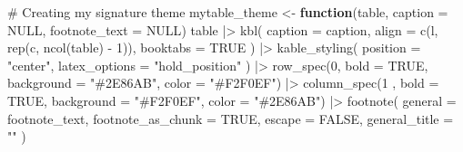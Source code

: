 \documentclass[
  letterpaper,
  DIV=11,
  numbers=noendperiod]{scrartcl}
\newenvironment{Shaded}{\begin{snugshade}}{\end{snugshade}}
\newcommand{\AttributeTok}[1]{\textcolor[rgb]{0.40,0.45,0.13}{#1}}
\newcommand{\CommentTok}[1]{\textcolor[rgb]{0.37,0.37,0.37}{#1}}
\newcommand{\ConstantTok}[1]{\textcolor[rgb]{0.56,0.35,0.01}{#1}}
\newcommand{\ControlFlowTok}[1]{\textcolor[rgb]{0.00,0.23,0.31}{\textbf{#1}}}
\newcommand{\DecValTok}[1]{\textcolor[rgb]{0.68,0.00,0.00}{#1}}
\newcommand{\FunctionTok}[1]{\textcolor[rgb]{0.28,0.35,0.67}{#1}}
\newcommand{\NormalTok}[1]{\textcolor[rgb]{0.00,0.23,0.31}{#1}}
\newcommand{\OtherTok}[1]{\textcolor[rgb]{0.00,0.23,0.31}{#1}}
\newcommand{\SpecialCharTok}[1]{\textcolor[rgb]{0.37,0.37,0.37}{#1}}
\newcommand{\StringTok}[1]{\textcolor[rgb]{0.13,0.47,0.30}{#1}}
\begin{document}
\begin{Shaded}
\begin{Highlighting}[]
\CommentTok{\# Creating my signature theme}
\NormalTok{mytable\_theme }\OtherTok{\textless{}{-}} \ControlFlowTok{function}\NormalTok{(table, }
                           \AttributeTok{caption =} \ConstantTok{NULL}\NormalTok{,}
                           \AttributeTok{footnote\_text =} \ConstantTok{NULL}\NormalTok{)}
\NormalTok{  table }\SpecialCharTok{|\textgreater{}}
    \FunctionTok{kbl}\NormalTok{(}
      \AttributeTok{caption =}\NormalTok{ caption,}
      \AttributeTok{align =} \FunctionTok{c}\NormalTok{(}\StringTok{\textquotesingle{}l\textquotesingle{}}\NormalTok{, }\FunctionTok{rep}\NormalTok{(}\StringTok{\textquotesingle{}c\textquotesingle{}}\NormalTok{, }\FunctionTok{ncol}\NormalTok{(table) }\SpecialCharTok{{-}} \DecValTok{1}\NormalTok{)),}
      \AttributeTok{booktabs =} \ConstantTok{TRUE}
\NormalTok{    ) }\SpecialCharTok{|\textgreater{}}
    \FunctionTok{kable\_styling}\NormalTok{(}
      \AttributeTok{position =} \StringTok{"center"}\NormalTok{,}
       \AttributeTok{latex\_options =} \StringTok{"hold\_position"}
\NormalTok{    ) }\SpecialCharTok{|\textgreater{}}
    \FunctionTok{row\_spec}\NormalTok{(}\DecValTok{0}\NormalTok{, }\AttributeTok{bold =} \ConstantTok{TRUE}\NormalTok{, }\AttributeTok{background =} \StringTok{"\#2E86AB"}\NormalTok{, }\AttributeTok{color =} \StringTok{"\#F2F0EF"}\NormalTok{) }\SpecialCharTok{|\textgreater{}}
  \FunctionTok{column\_spec}\NormalTok{(}\DecValTok{1}\NormalTok{ , }\AttributeTok{bold =} \ConstantTok{TRUE}\NormalTok{, }\AttributeTok{background =} \StringTok{"\#F2F0EF"}\NormalTok{, }\AttributeTok{color =} \StringTok{"\#2E86AB"}\NormalTok{) }\SpecialCharTok{|\textgreater{}}
    \FunctionTok{footnote}\NormalTok{(}
      \AttributeTok{general =}\NormalTok{ footnote\_text,}
      \AttributeTok{footnote\_as\_chunk =} \ConstantTok{TRUE}\NormalTok{,}
      \AttributeTok{escape =} \ConstantTok{FALSE}\NormalTok{,}
      \AttributeTok{general\_title =} \StringTok{""}
\NormalTok{    )}
\end{Highlighting}
\end{Shaded}
\end{document}
